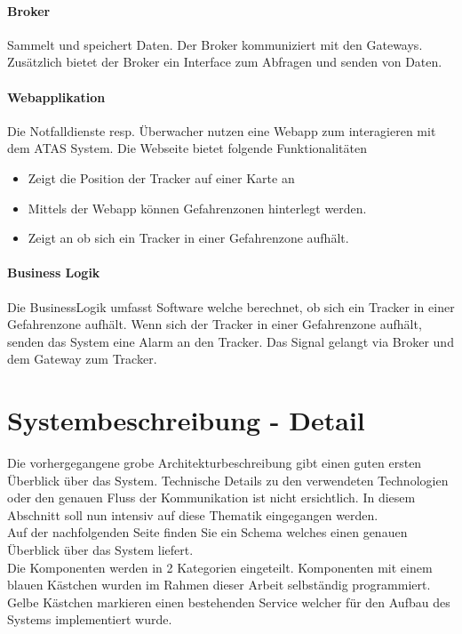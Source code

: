 \documentclass[11pt,english,german]{report}
\theoremstyle{definition}
\begin{document}
\subsubsection{Broker}
Sammelt und speichert Daten. Der Broker kommuniziert mit den Gateways. Zusätzlich bietet der Broker ein Interface zum Abfragen und senden von Daten.

\subsubsection{Webapplikation}
Die Notfalldienste resp. Überwacher nutzen eine Webapp zum interagieren mit dem ATAS System. Die Webseite bietet folgende Funktionalitäten
\begin{itemize}
	\item
		Zeigt die Position der Tracker auf einer Karte an 
	\item
		Mittels der Webapp können Gefahrenzonen hinterlegt werden.
	\item 
		Zeigt an ob sich ein Tracker in einer Gefahrenzone aufhält.	
\end{itemize}

\subsubsection{Business Logik}
Die BusinessLogik umfasst Software welche berechnet, ob sich ein Tracker in einer Gefahrenzone aufhält. Wenn sich der Tracker in einer Gefahrenzone aufhält, senden das System eine Alarm an den Tracker. Das Signal gelangt via Broker und dem Gateway zum Tracker.

\newpage
\chapter{Systembeschreibung - Detail}
Die vorhergegangene grobe Architekturbeschreibung gibt einen guten ersten Überblick über das System. Technische Details zu  den verwendeten Technologien oder den genauen Fluss der Kommunikation ist nicht ersichtlich. In diesem Abschnitt soll nun intensiv auf diese Thematik eingegangen werden.\\[0.3cm]
Auf der nachfolgenden Seite finden Sie ein Schema welches einen genauen Überblick über das System liefert.\\[0.3cm]
Die Komponenten werden in 2 Kategorien eingeteilt. Komponenten mit einem blauen Kästchen wurden im Rahmen dieser Arbeit selbständig programmiert. Gelbe Kästchen markieren einen bestehenden Service welcher für den Aufbau des Systems implementiert wurde. 
\end{document}
